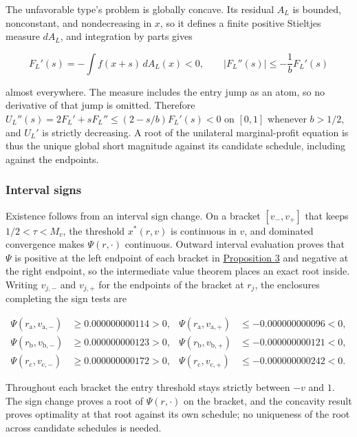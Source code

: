 \documentclass[
  12pt,
]{article}
\begin{document}
The unfavorable type's problem is globally concave. Its residual \(A_L\)
is bounded, nonconstant, and nondecreasing in \(x\), so it defines a
finite positive Stieltjes measure \(dA_L\), and integration by parts
gives

\[
F_L'(s)=-\int f(x+s)\,dA_L(x)<0,
\qquad |F_L''(s)|\le-\frac1bF_L'(s)
\tag{A.16}\label{eq:paper-a-16}
\]

almost everywhere. The measure includes the entry jump as an atom, so no
derivative of that jump is omitted. Therefore
\(U_L''(s)=2F_L'+sF_L''\le(2-s/b)F_L'(s)<0\) on \([0,1]\) whenever
\(b>1/2\), and \(U_L'\) is strictly decreasing. A root of the unilateral
marginal-profit equation is thus the unique global short magnitude
against its candidate schedule, including against the endpoints.

\subsubsection{Interval signs}\label{interval-signs}

Existence follows from an interval sign change. On a bracket
\([v_-,v_+]\) that keeps \(1/2<\tau<M_v\), the threshold \(x^*(r,v)\) is
continuous in \(v\), and dominated convergence makes \(\Psi(r,\cdot)\)
continuous. Outward interval evaluation proves that \(\Psi\) is positive
at the left endpoint of each bracket in
\hyperref[result-proposition-3]{Proposition 3} and negative at the right
endpoint, so the intermediate value theorem places an exact root inside.
Writing \(v_{j,-}\) and \(v_{j,+}\) for the endpoints of the bracket at
\(r_j\), the enclosures completing the sign tests are

\[
\begin{aligned}
\Psi(r_{\mathrm a},v_{\mathrm a,-})&\ge0.000000000114>0,&
\Psi(r_{\mathrm a},v_{\mathrm a,+})&\le-0.000000000096<0,\\
\Psi(r_{\mathrm b},v_{\mathrm b,-})&\ge0.000000000123>0,&
\Psi(r_{\mathrm b},v_{\mathrm b,+})&\le-0.000000000121<0,\\
\Psi(r_{\mathrm c},v_{\mathrm c,-})&\ge0.000000000172>0,&
\Psi(r_{\mathrm c},v_{\mathrm c,+})&\le-0.000000000242<0.
\end{aligned}
\tag{A.17}\label{eq:paper-a-17}
\]

Throughout each bracket the entry threshold stays strictly between
\(-v\) and \(1\). The sign change proves a root of \(\Psi(r,\cdot)\) on
the bracket, and the concavity result proves optimality at that root
against its own schedule; no uniqueness of the root across candidate
schedules is needed.
\end{document}
